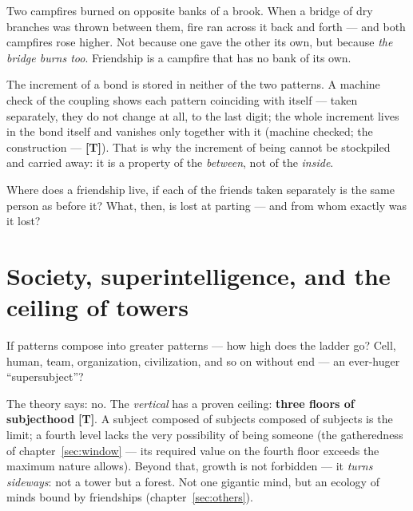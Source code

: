\documentclass[11pt,letterpaper]{article}
\newcommand{\stT}{\textbf{[T]}\xspace}
\begin{document}
\begin{talebox}
Two campfires burned on opposite banks of a brook. When a bridge of
dry branches was thrown between them, fire ran across it back and
forth --- and both campfires rose higher. Not because one gave the
other its own, but because \emph{the bridge burns too}. Friendship
is a campfire that has no bank of its own.
\end{talebox}

\begin{factbox}[To be precise]
The increment of a bond is stored in neither of the two patterns.
A machine check of the coupling shows each pattern coinciding with
itself --- taken separately, they do not change at all, to the last
digit; the whole increment lives in the bond itself and vanishes
only together with it (machine checked; the construction --- \stT).
That is why the increment of being cannot be stockpiled and carried
away: it is a property of the \emph{between}, not of the
\emph{inside}.
\end{factbox}

\begin{askbox}
Where does a friendship live, if each of the friends taken
separately is the same person as before it? What, then, is lost at
parting --- and from whom exactly was it lost?
\end{askbox}

\section{Society, superintelligence, and the ceiling of towers}
\label{sec:society}

If patterns compose into greater patterns --- how high does the
ladder go? Cell, human, team, organization, civilization, and so on
without end --- an ever-huger ``supersubject''?

The theory says: no. The \emph{vertical} has a proven ceiling:
\textbf{three floors of subjecthood} \stT. A subject composed of
subjects composed of subjects is the limit; a fourth level lacks the
very possibility of being someone (the gatheredness of
chapter~\ref{sec:window} --- its required value on the fourth floor
exceeds the maximum nature allows). Beyond that, growth is not
forbidden --- it \emph{turns sideways}: not a tower but a forest.
Not one gigantic mind, but an ecology of minds bound by friendships
(chapter~\ref{sec:others}).
\end{document}
